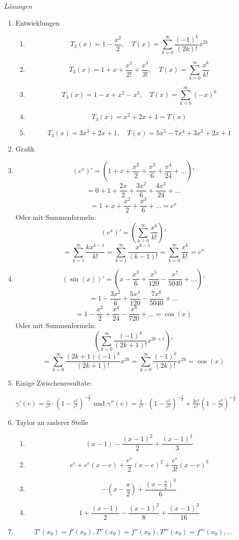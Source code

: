 \emph{Lösungen}
\begin{enumerate}
	\item Entwicklungen
	      \begin{enumerate}
		      \item \[T_3(x) = 1-\frac{x^2}{2} , \quad T(x) = \sum_{k=0}^{\infty} \frac{(-1)^k}{(2k)!} x^{2k}\]
		      \item         \[T_3(x) = 1+x+\frac{x^2}{2!}+\frac{x^3}{3!}, \quad T(x) = \sum_{k=0}^{\infty} \frac{x^k}{k!}\]
		      \item         \[T_3(x) = 1-x+x^2-x^3, \quad T(x) = \sum_{k=0}^{\infty} (-x)^k\]
		      \item  $$T_3(x) = x^2+2x+1 = T(x) $$
		      \item         \[T_3(x) = 3x^3+2x+1, \quad T(x) = 5x^5-7x^4+3x^3+2x+1 \]
	      \end{enumerate}
	\item Grafik
	\item \[(e^x )'=(1+x+\frac{x^2}{2}+\frac{x^3}{6}+\frac{x^4}{24}+\ldots)'\]
	      \[=0+ 1+\frac{2x}{2}+\frac{3x^2}{6}+\frac{4x^3}{24}+\ldots\]
	      \[= 1+x+\frac{x^2}{2}+\frac{x^3}{6}+\ldots=e^x\]
	      Oder mit Summenformeln:
	      \[(e^x )'=\left(\sum_{k=0}^{\infty} \frac{x^k}{k!}\right)'\]
	      \[=\sum_{k=1}^{\infty} \frac{kx^{k-1}}{k!}=\sum_{k=1}^{\infty} \frac{x^{k-1}}{(k-1)!}=\sum_{k=0}^{\infty} \frac{x^k}{k!}=e^x\]
	\item \[(\sin(x) )'=(x-\frac{x^3}{6}+\frac{x^5}{120}-\frac{x^7}{5040}+\ldots)'\]
	      \[=1-\frac{3x^2}{6}+\frac{5x^4}{120}-\frac{7x^6}{5040}+\ldots\]
	      \[=1-\frac{x^2}{2}+\frac{x^4}{24}-\frac{x^6}{720}+\ldots=\cos(x)\]
	      Oder mit Summenformeln:
	      \[\left(\sum_{k=0}^{\infty} \frac{(-1)^k}{(2k+1)!} x^{2k+1}\right)'\]
	      \[=\sum_{k=0}^{\infty} \frac{(2k+1)(-1)^k}{(2k+1)!} x^{2k}=\sum_{k=0}^{\infty} \frac{(-1)^k}{(2k)!} x^{2k}=\cos(x)\]
	\item Einige Zwischenresultate:

	      $ \gamma'(v) = \frac{v}{c^2}\cdot \left(1-\frac{v^2}{c^2}\right)^{-\frac{3}{2}}  $ und $\gamma''(v) = \frac{1}{c^2}\cdot \left(1-\frac{v^2}{c^2}\right)^{-\frac{3}{2}} + \frac{3v^2}{c^4} \left(1-\frac{v^2}{c^2}\right)^{-\frac{5}{2}} $


	\item Taylor an anderer Stelle
	      \begin{enumerate}
		      \item \[(x-1)-\frac{(x-1)^2}{2}+\frac{(x-1)^3}{3}\]
		      \item \[e^e+e^e (x-e)+\frac{e^e}{2} (x-e)^2+\frac{e^e}{3!} (x-e)^3\]
		      \item \[-(x-\frac{\pi}{2})+\frac{(x-\frac{\pi}{2})^3}{6}\]
		      \item
		            \[1+\frac{(x-1)}{2}-\frac{(x-1)^2}{8}+\frac{(x-1)^3}{16}\]

	      \end{enumerate}
	\item
	      \[T'(x_0)=f'(x_0), T''(x_0)=f''(x_0), T'''(x_0)=f'''(x_0), \ldots\]

\end{enumerate}

